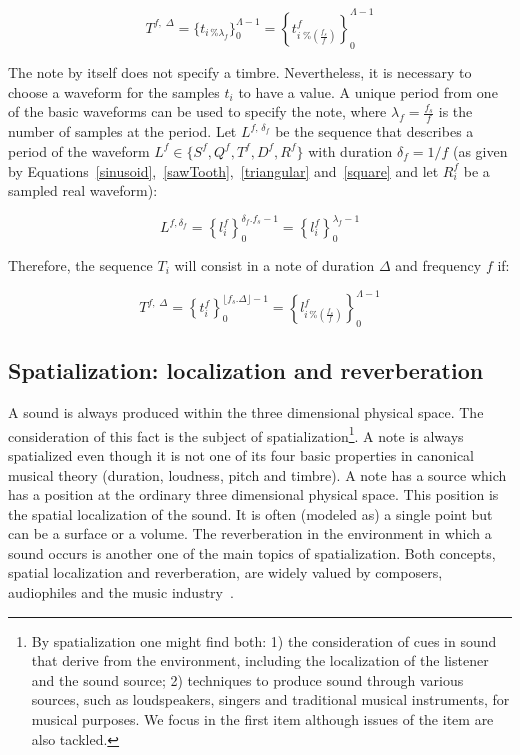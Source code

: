 \begin{equation}\label{eq:notaBasica}
T^{f,\; \Delta}=\{t_{i \, \% \lambda_f} \}_0^{\Lambda-1}= \left \{t^f_{i \; \% \left( \frac{f_s}{f} \right) } \right \}_0^{\Lambda-1}
\end{equation}

The note by itself does not specify a timbre. Nevertheless, it is necessary to choose a waveform for the samples $t_i$ to have a value. A unique period from one of the basic waveforms can be used to specify the note, where $\lambda_f=\frac{f_s}{f}$ is the number of samples at the period. Let $L^{f,\, \delta_f} $ be the sequence that describes a period of the waveform $L^f \in \{S^f,Q^f,T^f,D^f,R^f \}$ with duration $\delta_f=1/f$ (as given by Equations~\ref{sinusoid},~\ref{sawTooth},~\ref{triangular} and~\ref{square} and let $R_i^f$ be a sampled real waveform):

\begin{equation}\label{periodoUnico}
L^{f , \delta_f } = \left\{ l_i^f \right\}_0^{\delta_f . f_s -1}=\left\{ l_i^f \right\}_0^{\lambda_f-1}
\end{equation}

Therefore, the sequence $T_i$ will consist in a note of duration $\Delta$ and frequency $f$ if:

\begin{equation}\label{eq:notaBasicaTimbre}
T^{f,\; \Delta}=\left\{t_i^f\right\}_0^{\lfloor f_s . \Delta \rfloor -1}=\left \{ l^f_{i\,\%\left(\frac{f_s}{f}\right)} \right \}_0^{\Lambda-1}
\end{equation}

\subsection{Spatialization: localization and reverberation}\label{subsec:spac}
A sound is always produced within the three dimensional physical space.
The consideration of this fact is the subject of spatialization\footnote{By
spatialization one might find both:
1) the consideration of cues in sound that derive from the environment,
including the localization of the listener and the sound source;
2) techniques to produce sound through various sources, such as loudspeakers, singers and traditional musical instruments, for musical purposes.
We focus in the first item although issues of the item are also tackled.}.
A note is always spatialized
even though it is not one of its four basic properties in canonical musical theory (duration, loudness, pitch and timbre).
A note has a source which has a position at the ordinary three dimensional physical space.
This position is the spatial localization of the sound.
It is often (modeled as) a single point but can be a surface or a volume.
The reverberation in the environment in which a sound occurs is another one of the main topics of spatialization.
Both concepts, spatial localization and reverberation,
are widely valued by composers, audiophiles and the music industry~\cite{floEsp}.

